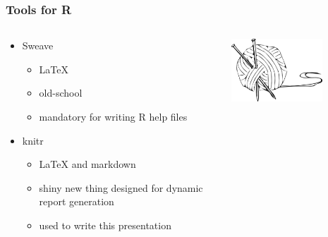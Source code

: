 \documentclass{beamer}\usepackage{graphicx, color}
\begin{document}
\begin{frame}
\frametitle{Tools for R}
\begin{columns}
\begin{column}{0.5\textwidth}
\begin{itemize}
\item Sweave
\begin{itemize}
\item {\LaTeX}
\item old-school
\item mandatory for writing R help files
\end{itemize}
\item knitr
\begin{itemize}
\item {\LaTeX} and markdown
\item shiny new thing designed for dynamic report generation
\item used to write this presentation
\end{itemize}
\end{itemize}
\end{column}
\begin{column}{0.5\textwidth}
\includegraphics[width = 0.7\textwidth, keepaspectratio = true]{knit-logo}
\end{column}
\end{columns}
\end{frame}
\end{document}
